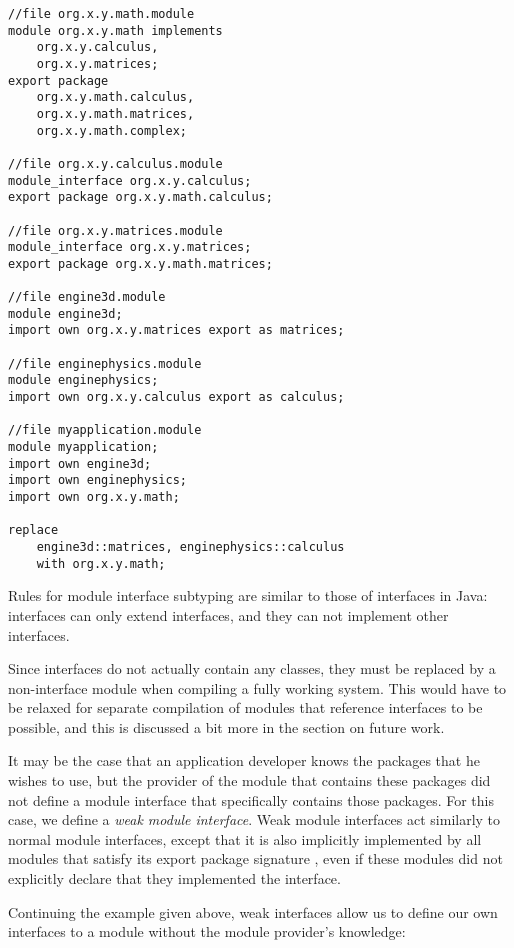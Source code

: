 \begin{lstlisting}[caption=Module Interfaces]
//file org.x.y.math.module
module org.x.y.math implements 
	org.x.y.calculus,
	org.x.y.matrices;
export package 
	org.x.y.math.calculus,
	org.x.y.math.matrices,
	org.x.y.math.complex;
	
//file org.x.y.calculus.module
module_interface org.x.y.calculus;
export package org.x.y.math.calculus;

//file org.x.y.matrices.module
module_interface org.x.y.matrices;
export package org.x.y.math.matrices;

//file engine3d.module
module engine3d;
import own org.x.y.matrices export as matrices;

//file enginephysics.module
module enginephysics;
import own org.x.y.calculus export as calculus;

//file myapplication.module
module myapplication;
import own engine3d;
import own enginephysics;
import own org.x.y.math;

replace 
	engine3d::matrices, enginephysics::calculus
	with org.x.y.math;
\end{lstlisting}

Rules for module interface subtyping are similar to those of interfaces in Java:
interfaces can only extend interfaces, and they can not implement other
interfaces. 

Since interfaces do not actually contain any classes, they must be replaced
by a non-interface module when compiling a fully working system. This would
have to be relaxed for separate compilation of modules that reference interfaces
to be possible, and this is discussed a bit more in the section on future work.


It may be the case that an application developer knows the packages that
he wishes to use, but the provider of the module that contains these packages 
did not define a module interface that specifically contains those packages. For
this case, we define a \textit{weak module interface}. Weak module interfaces act similarly
to normal module interfaces, except that it is also implicitly implemented
by all modules that satisfy its export package signature \cite{mcdirmid01jiazzi, componentnextgen}, 
even if these modules did not explicitly declare that they implemented the interface.

Continuing the example given above, weak interfaces allow us to define 
our own interfaces to a module without the module provider's knowledge:

